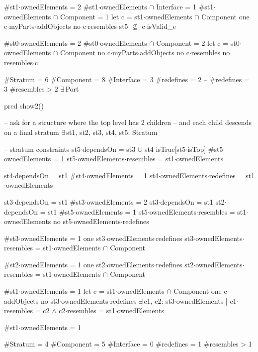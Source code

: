 {{    #st1$\cdot$ownedElements = 2
    #st1$\cdot$ownedElements $\cap$ Interface = 1
    #st1$\cdot$ownedElements $\cap$ Component = 1
    let c = st1$\cdot$ownedElements $\cap$ Component
    {
      one c$\cdot$myParts$\cdot$addObjects
      no c$\cdot$resembles
      st5 $\not\subseteq$ c$\cdot$isValid_e      
    }

    #st0$\cdot$ownedElements = 2
    #st0$\cdot$ownedElements $\cap$ Component = 2
    let c = st0$\cdot$ownedElements $\cap$ Component
    {
      no c$\cdot$myParts$\cdot$addObjects
      no c$\cdot$resembles
      no resembles$\cdot$c
    }
  }

  #Stratum = 6
  #Component = 8
  #Interface = 3
  #redefines = 2
--  #redefines = 3
  #resembles > 2
  $\exists\,$Port
}


pred show2()
{
  -- ask for a structure where the top level has 2 children
  -- and each child descends on a final stratum
  $\exists\,$st1, st2, st3, st4, st5: Stratum
  {
    -- stratum constraints
    st5$\cdot$dependsOn = st3 $\cup$ st4
    isTrue[st5$\cdot$isTop]
    #st5$\cdot$ownedElements = 1
    st5$\cdot$ownedElements$\cdot$resembles = st1$\cdot$ownedElements
    
    st4$\cdot$dependsOn = st1
    #st4$\cdot$ownedElements = 1
    st4$\cdot$ownedElements$\cdot$redefines = st1$\cdot$ownedElements

    st3$\cdot$dependsOn = st1
    #st3$\cdot$ownedElements = 2
    st3$\cdot$dependsOn = st1
    st2$\cdot$dependsOn = st1
    #st5$\cdot$ownedElements = 1
    st5$\cdot$ownedElements$\cdot$resembles = st1$\cdot$ownedElements
    no st5$\cdot$ownedElements$\cdot$redefines
    
    #st3$\cdot$ownedElements = 1
    one st3$\cdot$ownedElements$\cdot$redefines
    st3$\cdot$ownedElements$\cdot$resembles = st1$\cdot$ownedElements $\cap$ Component

    #st2$\cdot$ownedElements = 1
    one st2$\cdot$ownedElements$\cdot$redefines
    st2$\cdot$ownedElements$\cdot$resembles = st1$\cdot$ownedElements $\cap$ Component
    
    #st1$\cdot$ownedElements = 1
    let c = st1$\cdot$ownedElements $\cap$ Component
    {
      one c$\cdot$addObjects
    }
    no st3$\cdot$ownedElements$\cdot$redefines
    $\exists\,$c1, c2: st3$\cdot$ownedElements |
      c1$\cdot$resembles = c2 $\wedge$ c2$\cdot$resembles = st1$\cdot$ownedElements

    #st1$\cdot$ownedElements = 1
  }
  
  #Stratum = 4
  #Component = 5
  #Interface = 0
  #redefines = 1
  #resembles > 1
}

